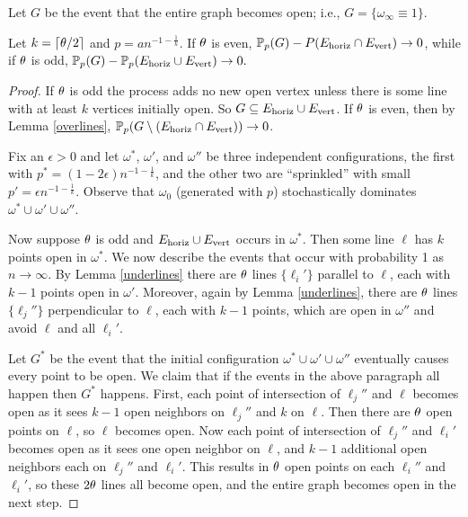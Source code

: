 Let $G$ be the event that the entire graph becomes open; i.e., $G = \{\omega_\infty\equiv 1\}$.
\begin{lemma} \label{events}
Let $k = \lceil \theta/2\rceil$ and $p = a n^{-1-\frac{1}{k}}$.  If $\theta$ is even, $\mathbb{P}_p(G)-P(E_{\text{horiz}} \cap E_{\text{vert}}) \to 0$, while if $\theta$ is odd,
$\mathbb{P}_p(G)- \mathbb{P}_p(E_{\text{horiz}} \cup E_{\text{vert}}) \to 0.$
\end{lemma}

\begin{proof}
If $\theta$ is odd the process adds no new open vertex unless there is some line with at least $k$ vertices initially open. So $G \subseteq E_{\text{horiz}} \cup E_{\text{vert}}$.
If $\theta$ is even, then by Lemma \ref{overlines}, 
$\mathbb{P}_p(G \setminus (E_{\text{horiz}} \cap E_{\text{vert}})) \to 0$.

Fix an $\epsilon>0$ and let $\omega^*$, $\omega'$, and $\omega''$ be three
independent configurations, the first with $p^*=(1-2\epsilon) n^{-1-\frac 1k}$, and 
the other two are ``sprinkled'' 
with small $p'=\epsilon n^{-1-\frac 1k}$. Observe that $\omega_0$ (generated with $p$) stochastically 
dominates $\omega^*\cup\omega'\cup\omega''$. 

Now suppose $\theta$ is odd and $E_{\text{horiz}} \cup E_{\text{vert}}$ occurs in $\omega^*$. 
Then some line $\ell$ has $k$ points open in $\omega^*$.
We now describe the events that occur with probability 1 as $n\to\infty$. 
By Lemma \ref{underlines} 
there are $\theta$ lines $\{\ell_i'\}$ parallel to $\ell$, each with $k-1$ 
points open in $\omega'$. 
Moreover, again by Lemma \ref{underlines}, there are $\theta$ lines $\{\ell_j''\}$ 
perpendicular to $\ell$, 
each with $k-1$ points, which are open in $\omega''$ and avoid $\ell$ and all 
$\ell_i'$.

Let $G^*$ be the event that the initial configuration 
$\omega^*\cup\omega'\cup\omega''$ eventually causes every point to be open.
We claim that if the events in the above paragraph all happen then $G^*$ happens. 
First, each point of intersection of $\ell_j''$ and $\ell$ becomes open as it sees
$k-1$ open neighbors on $\ell_j''$ and $k$ on $\ell$. Then there are $\theta$ open points on 
$\ell$, so $\ell$ becomes open.
Now each point of intersection of $\ell_j''$ and $\ell_i'$ becomes open as it 
sees one open neighbor on $\ell$, and $k-1$ additional 
open neighbors each on $\ell_j''$ and $\ell_i'$. 
This results in  $\theta$ open points on each $\ell_i''$ and $\ell_i'$, so 
these $2\theta$ lines all become open, and the entire graph becomes open in the next step.


\end{proof}
